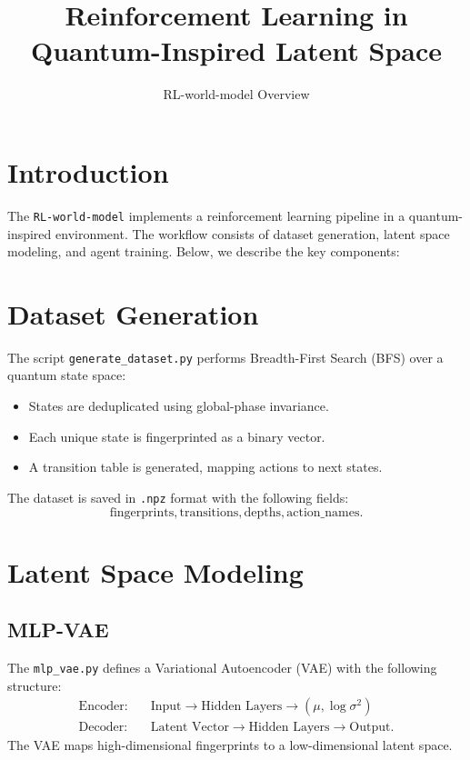 \documentclass{article}
\begin{document}
\title{Reinforcement Learning in Quantum-Inspired Latent Space}
\author{RL-world-model Overview}
\date{}
\maketitle

\section*{Introduction}
The \texttt{RL-world-model} implements a reinforcement learning pipeline in a quantum-inspired environment. The workflow consists of dataset generation, latent space modeling, and agent training. Below, we describe the key components:

\section*{Dataset Generation}
The script \texttt{generate\_dataset.py} performs Breadth-First Search (BFS) over a quantum state space:
\begin{itemize}
    \item States are deduplicated using global-phase invariance.
    \item Each unique state is fingerprinted as a binary vector.
    \item A transition table is generated, mapping actions to next states.
\end{itemize}
The dataset is saved in \texttt{.npz} format with the following fields:
\[
\text{fingerprints}, \text{transitions}, \text{depths}, \text{action\_names}.
\]

\section*{Latent Space Modeling}
\subsection*{MLP-VAE}
The \texttt{mlp\_vae.py} defines a Variational Autoencoder (VAE) with the following structure:
\begin{align*}
\text{Encoder:} & \quad \text{Input} \to \text{Hidden Layers} \to (\mu, \log \sigma^2) \\
\text{Decoder:} & \quad \text{Latent Vector} \to \text{Hidden Layers} \to \text{Output}.
\end{align*}
The VAE maps high-dimensional fingerprints to a low-dimensional latent space.
\end{document}

